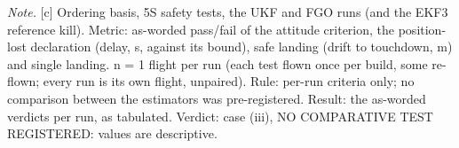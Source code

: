 \begin{table}[htbp]
\textit{Note.} [c] Ordering basis, 5S safety tests, the UKF and FGO runs (and the EKF3 reference kill). Metric: as-worded pass/fail of the attitude criterion, the position-lost declaration (delay, s, against its bound), safe landing (drift to touchdown, m) and single landing. n = 1 flight per run (each test flown once per build, some re-flown; every run is its own flight, unpaired). Rule: per-run criteria only; no comparison between the estimators was pre-registered. Result: the as-worded verdicts per run, as tabulated. Verdict: case (iii), NO COMPARATIVE TEST REGISTERED: values are descriptive.\par
\end{table}

